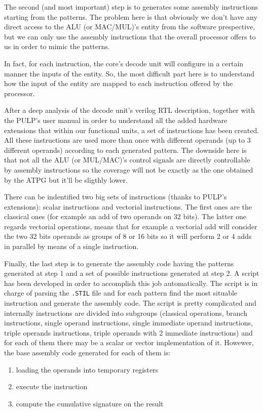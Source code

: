 \documentclass[paper=a4, fontsize=10pt]{scrartcl}	%
\begin{document}
	The second (and most important) step is to generates some assembly instructions starting from the patterns. The problem here is that obviously we don't have any direct access to the ALU (or MAC/MUL)'s entity from the software prespective, but we can only use the assembly instructions that the overall processor offers to us in order to mimic the patterns. \newline
	
	In fact, for each instruction, the core's decode unit will configure in a certain manner the inputs of the entity. So, the most difficult part here is to understand how the input of the entity are mapped to each instruction offered by the processor. \newline

	After a deep analysis of the decode unit's verilog RTL description, together with the PULP's user manual in order to understand all the added hardware extensions that within our functional units, a set of instructions has been created. All these instructions are used more than once with different operands (up to 3 different operands) according to each generated pattern. The downside here is that not all the ALU (or MUL/MAC)'s control signals are directly controllable by assembly instructions so the coverage will not be exactly as the one obtained by the ATPG but it'll be sligthly lower. \newline
	
	There can be indentified two big sets of instructions (thanks to PULP's extensions): scalar instructions and vectorial instructions. The first ones are the classical ones (for example an add of two operands on 32 bits). The latter one regards vectorial operations, means that for example a vectorial add will consider the two 32 bits operands as groups of 8 or 16 bits so it will perform 2 or 4 adds in parallel by means of a single instruction. \newline

	Finally, the last step is to generate the assembly code having the patterns generated at step 1 and a set of possible instructions generated at step 2. A script has been developed in order to accomplish this job automatically. The script is in charge of parsing the \texttt{.STIL} file and for each pattern find the most situable instruction and generate the assembly code. The script is pretty complicated and internally instructions are divided into subgroups (classical operations, branch instructions, single operand instructions, single immediate operand instructions, triple operands instructions, triple operands with 2 immediate instructions) and for each of them there may be a scalar or vector implementation of it. Howewer, the base assembly code generated for each of them is:
	\begin{enumerate}
		\itemsep0sp
		\item loading the operands into temporary registers
		\item execute the instruction
		\item compute the cumulative signature on the result
	\end{enumerate}
\end{document}
